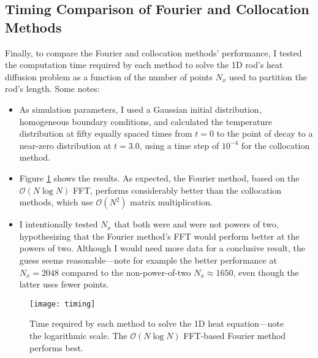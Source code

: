 \documentclass[11pt, a4paper]{article}
\begin{document}
\subsection{Timing Comparison of Fourier and Collocation Methods}
Finally, to compare the Fourier and collocation methods' performance, I tested the computation time required by each method to solve the 1D rod's heat diffusion problem as a function of the number of points $ N_{x} $ used to partition the rod's length. Some notes:
\begin{itemize}
	\item As simulation parameters, I used a Gaussian initial distribution, homogeneous boundary conditions, and calculated the temperature distribution at fifty equally spaced times from $ t = 0 $ to the point of decay to a near-zero distribution at $ t = 3.0 $, using a time step of $ 10^{-4} $ for the collocation method.
	
	\item Figure \ref{spec:fig:timing} shows the results. As expected, the Fourier method, based on the $ \mathcal{O}(N\log N) $ FFT, performs considerably better than the collocation methods, which use $ \mathcal{O}(N^{2}) $ matrix multiplication. 
	
	\item I intentionally tested $ N_{x} $ that both were and were not powers of two, hypothesizing that the Fourier method's FFT would perform better at the powers of two. Although I would need more data for a conclusive result, the guess seems reasonable---note for example the better performance at $ N_{x} = 2048 $ compared to the non-power-of-two $ N_{x} \approx 1650 $, even though the latter uses fewer points.
	
\end{itemize}


\begin{figure}
\centering
\texttt{[image: timing]}
\caption{Time required by each method to solve the 1D heat equation---note the logarithmic scale. The $ \mathcal{O}(N\log N) $ FFT-based Fourier method performs best.  }
\label{spec:fig:timing}
\end{figure}


\appendix
\end{document}
